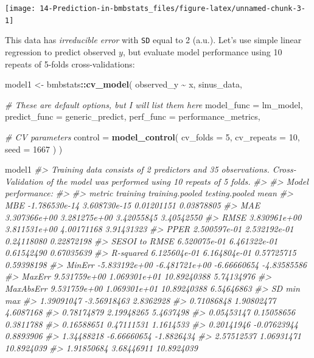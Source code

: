 \documentclass[
]{book}
\newenvironment{Shaded}{\begin{snugshade}}{\end{snugshade}}
\newcommand{\CommentTok}[1]{\textcolor[rgb]{0.56,0.35,0.01}{\textit{#1}}}
\newcommand{\DataTypeTok}[1]{\textcolor[rgb]{0.13,0.29,0.53}{#1}}
\newcommand{\DecValTok}[1]{\textcolor[rgb]{0.00,0.00,0.81}{#1}}
\newcommand{\KeywordTok}[1]{\textcolor[rgb]{0.13,0.29,0.53}{\textbf{#1}}}
\newcommand{\NormalTok}[1]{#1}
\newcommand{\OperatorTok}[1]{\textcolor[rgb]{0.81,0.36,0.00}{\textbf{#1}}}
\newcommand{\StringTok}[1]{\textcolor[rgb]{0.31,0.60,0.02}{#1}}
\begin{document}
\begin{center}\texttt{[image: 14-Prediction-in-bmbstats\_files/figure-latex/unnamed-chunk-3-1]} \end{center}

This data has \emph{irreducible error} with \texttt{SD} equal to 2 (a.u.). Let's use simple linear regression to predict observed \(y\), but evaluate model performance using 10 repeats of 5-folds cross-validations:

\begin{Shaded}
\begin{Highlighting}[]
\NormalTok{model1 <{-}}\StringTok{ }\NormalTok{bmbstats}\OperatorTok{::}\KeywordTok{cv\_model}\NormalTok{(}
\NormalTok{  observed\_y }\OperatorTok{\textasciitilde{}}\StringTok{ }\NormalTok{x,}
\NormalTok{  sinus\_data,}

  \CommentTok{\# These are default options, but I will list them here}
  \DataTypeTok{model\_func =}\NormalTok{ lm\_model,}
  \DataTypeTok{predict\_func =}\NormalTok{ generic\_predict,}
  \DataTypeTok{perf\_func =}\NormalTok{ performance\_metrics,}

  \CommentTok{\# CV parameters}
  \DataTypeTok{control =} \KeywordTok{model\_control}\NormalTok{(}
    \DataTypeTok{cv\_folds =} \DecValTok{5}\NormalTok{,}
    \DataTypeTok{cv\_repeats =} \DecValTok{10}\NormalTok{,}
    \DataTypeTok{seed =} \DecValTok{1667}
\NormalTok{  )}
\NormalTok{)}

\NormalTok{model1}
\CommentTok{\#> Training data consists of 2 predictors and 35 observations. Cross{-}Validation of the model was performed using 10 repeats of 5 folds.}
\CommentTok{\#> }
\CommentTok{\#> Model performance:}
\CommentTok{\#> }
\CommentTok{\#>         metric      training training.pooled testing.pooled        mean}
\CommentTok{\#>            MBE {-}1.786530e{-}14    3.608730e{-}15     0.01201151  0.03878805}
\CommentTok{\#>            MAE  3.307366e+00    3.281275e+00     3.42055845  3.40542550}
\CommentTok{\#>           RMSE  3.830961e+00    3.811531e+00     4.00171168  3.91431323}
\CommentTok{\#>           PPER  2.500597e{-}01    2.532192e{-}01     0.24118080  0.22872198}
\CommentTok{\#>  SESOI to RMSE  6.520075e{-}01    6.461322e{-}01     0.61542490  0.67035639}
\CommentTok{\#>      R{-}squared  6.125604e{-}01    6.164804e{-}01     0.57725715  0.59398198}
\CommentTok{\#>         MinErr {-}5.833192e+00   {-}6.481721e+00    {-}6.66660654 {-}4.83585586}
\CommentTok{\#>         MaxErr  9.531759e+00    1.069301e+01    10.89240388  5.74134976}
\CommentTok{\#>      MaxAbsErr  9.531759e+00    1.069301e+01    10.89240388  6.54646863}
\CommentTok{\#>          SD         min        max}
\CommentTok{\#>  1.39091047 {-}3.56918463  2.8362928}
\CommentTok{\#>  0.71086848  1.90802477  4.6087168}
\CommentTok{\#>  0.78174879  2.19948265  5.4637498}
\CommentTok{\#>  0.05453147  0.15058656  0.3811788}
\CommentTok{\#>  0.16588651  0.47111531  1.1614533}
\CommentTok{\#>  0.20141946 {-}0.07623944  0.8893906}
\CommentTok{\#>  1.34488218 {-}6.66660654 {-}1.8826434}
\CommentTok{\#>  2.57512537  1.06931471 10.8924039}
\CommentTok{\#>  1.91850684  3.68446911 10.8924039}
\end{Highlighting}
\end{Shaded}
\end{document}
